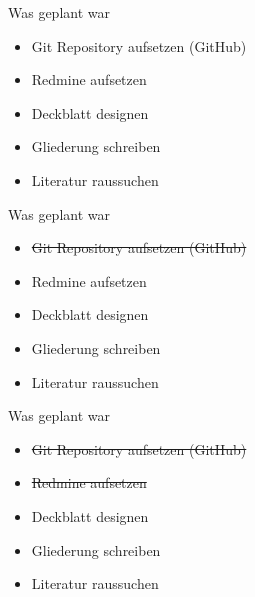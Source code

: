 \documentclass{beamer}
\institute{Universität Hamburg -- Fachbereich Informatik -- Abschlussarbeiten Seminar}
\date{\today}
\title{\myTitle}
\author{\myName}
\begin{document}
{
    \frame{
        \titlepage
    }
}

\begin{frame}{Was geplant war}
  \begin{itemize}
    \item Git Repository aufsetzen (GitHub)
    \item Redmine aufsetzen
    \item Deckblatt designen
    \item Gliederung schreiben
    \item Literatur raussuchen
  \end{itemize}
\end{frame}

\begin{frame}{Was geplant war}
  \begin{itemize}
    \item \sout{Git Repository aufsetzen (GitHub)}
    \item Redmine aufsetzen
    \item Deckblatt designen
    \item Gliederung schreiben
    \item Literatur raussuchen
  \end{itemize}
\end{frame}

\begin{frame}{Was geplant war}
  \begin{itemize}
    \item \sout{Git Repository aufsetzen (GitHub)}
    \item \sout{Redmine aufsetzen}
    \item Deckblatt designen
    \item Gliederung schreiben
    \item Literatur raussuchen
  \end{itemize}
\end{frame}
\end{document}

